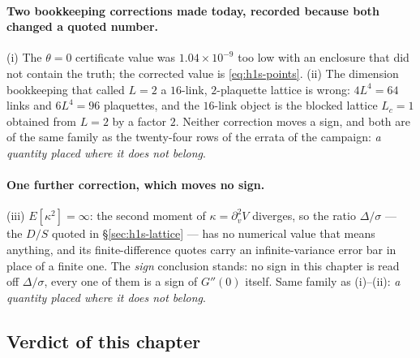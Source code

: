 \paragraph{Two bookkeeping corrections made today, recorded because both changed a quoted number.}
(i) The $\theta=0$ certificate value was $1.04\times10^{-9}$ too low with an enclosure that did not
contain the truth; the corrected value is \eqref{eq:h1s-points}. (ii) The dimension bookkeeping that
called $L=2$ a $16$-link, $2$-plaquette lattice is wrong: $4L^{4}=64$ links and $6L^{4}=96$
plaquettes, and the $16$-link object is the blocked lattice $L_{c}=1$ obtained from $L=2$ by a factor
$2$. Neither correction moves a sign, and both are of the same family as the twenty-four rows of the
errata of the campaign: \emph{a quantity placed where it does not belong}.


\paragraph{One further correction, which moves no sign.} (iii) $E[\kappa^{2}]=\infty$: the second moment
of $\kappa=\partial_{v}^{2}V$ diverges, so the ratio $\Delta/\sigma$ --- the $D/S$ quoted in
\S\ref{sec:h1s-lattice} --- has no numerical value that means anything, and its finite-difference quotes
carry an infinite-variance error bar in place of a finite one. The \emph{sign} conclusion stands: no sign
in this chapter is read off $\Delta/\sigma$, every one of them is a sign of $G''(0)$ itself. Same family
as (i)--(ii): \emph{a quantity placed where it does not belong}.

\subsection{Verdict of this chapter}
\label{sec:h1s-verdict}

